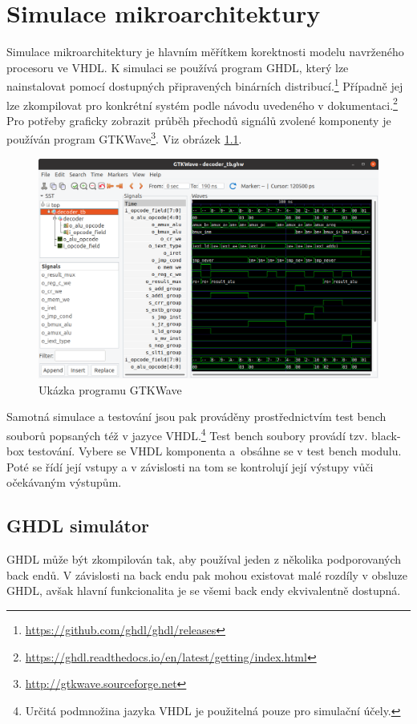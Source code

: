 \documentclass[
  digital, %
  color,   %
  table,   %
  twoside, %
  nolof,   %
  nolot,   %
]{fithesis3}
\begin{document}
\chapter{Simulace mikroarchitektury}
Simulace mikroarchitektury je hlavním měřítkem korektnosti modelu navrženého procesoru ve VHDL.  K simulaci se používá program GHDL, který lze nainstalovat pomocí dostupných připravených binárních distribucí.\footnote{\url{https://github.com/ghdl/ghdl/releases}} Případně jej lze zkompilovat pro konkrétní systém podle návodu uvedeného v dokumentaci.\footnote{\url{https://ghdl.readthedocs.io/en/latest/getting/index.html}} Pro potřeby graficky zobrazit průběh přechodů signálů zvolené komponenty je používán program GTKWave\footnote{\url{http://gtkwave.sourceforge.net}}. Viz obrázek \ref{fig:gtkwave}.

\begin{figure}[H]
  \begin{center}
    \includegraphics[height=0.4\textheight]{img/gtkwave}
  \end{center}
  \caption{Ukázka programu GTKWave}
  \label{fig:gtkwave}
\end{figure}

Samotná simulace a testování jsou pak prováděny prostřednictvím test bench souborů popsaných též v jazyce VHDL.\footnote{Určitá podmnožina jazyka VHDL je použitelná pouze pro simulační účely.} Test bench soubory provádí tzv. black-box testování. Vybere se VHDL komponenta a~obsáhne se v test bench modulu. Poté se řídí její vstupy a v závislosti na tom se kontrolují její výstupy vůči očekávaným výstupům.

\section{GHDL simulátor}
GHDL může být zkompilován tak, aby používal jeden z několika podporovaných back endů. V závislosti na back endu pak mohou existovat malé rozdíly v obsluze GHDL, avšak hlavní funkcionalita je se všemi back endy ekvivalentně dostupná.
\end{document}

